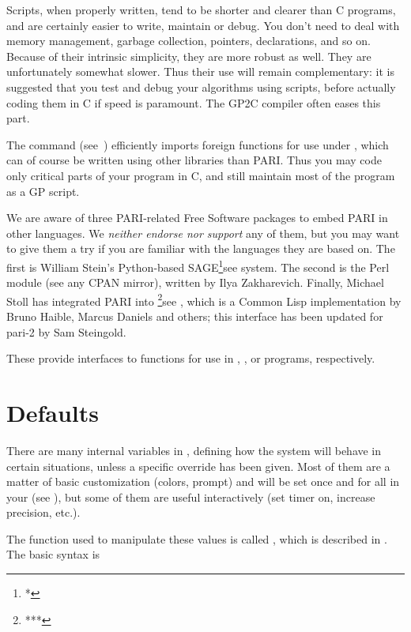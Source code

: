 Scripts, when properly written, tend to be shorter and clearer than C
programs, and are certainly easier to write, maintain or debug. You don't
need to deal with memory management, garbage collection, pointers,
declarations, and so on. Because of their intrinsic simplicity, they are more
robust as well. They are unfortunately somewhat slower. Thus their use will
remain complementary: it is suggested that you test and debug your algorithms
using scripts, before actually coding them in C if speed is paramount.
The GP2C compiler often eases this part.

The  command (see~) efficiently imports
foreign functions for use under , which can of course be written
using other libraries than PARI. Thus you may code only critical parts
of your program in C, and still maintain most of the program as a GP script.

We are aware of three PARI-related Free Software packages to embed PARI in
other languages. We \emph{neither endorse nor support} any of them, but you
may want to give them a try if you are familiar with the languages they are
based on. The first is William Stein's Python-based SAGE\footnote{*}{see
} system. The second is the  Perl
module (see any CPAN mirror), written by Ilya Zakharevich.
Finally, Michael Stoll has integrated PARI into \footnote{***}{see
}, which is a Common Lisp implementation by Bruno
Haible, Marcus Daniels and others; this interface has been updated for pari-2
by Sam Steingold.

These provide interfaces to  functions for use in
, , or 
programs, respectively.

\section{Defaults}
\label{se:defaults}

\noindent There are many internal variables in , defining how the
system will behave in certain situations, unless a specific override has been
given. Most of them are a matter of basic customization (colors, prompt) and
will be set once and for all in your  (see
), but some of them are useful interactively (set timer on,
increase precision, etc.).

The function used to manipulate these values is called , which
is described in . The basic syntax is


